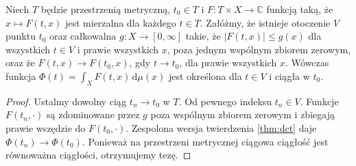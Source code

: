 \begin{twierdzenie}
\label{thm:parameter-continuity}
Niech $T$ będzie przestrzenią metryczną, $t_0\in T$
i $F:T\times X\to\mathbb C$ funkcją taką, że
$x\mapsto F(t,x)$ jest mierzalna dla każdego $t\in T$.
Załóżmy, że istnieje otoczenie $V$ punktu $t_0$
oraz całkowalna $g:X\to[0,\infty]$ takie, że
$|F(t,x)|\le g(x)$ dla wszystkich $t\in V$ i
prawie wszystkich $x$, poza jednym wspólnym zbiorem
zerowym, oraz że $F(t,x)\to F(t_0,x)$, gdy
$t\to t_0$, dla prawie wszystkich $x$.
Wówczas funkcja
$\Phi(t)=\int_XF(t,x)\,\mathrm d\mu(x)$
jest określona dla $t\in V$ i ciągła w $t_0$.
\end{twierdzenie}
\begin{proof}
Ustalmy dowolny ciąg $t_n\to t_0$ w $T$.
Od pewnego indeksu $t_n\in V$. Funkcje
$F(t_n,\cdot)$ są zdominowane przez $g$ poza
wspólnym zbiorem zerowym i zbiegają prawie wszędzie
do $F(t_0,\cdot)$. Zespolona wersja twierdzenia
\ref{thm:dct} daje $\Phi(t_n)\to\Phi(t_0)$.
Ponieważ na przestrzeni metrycznej ciągowa
ciągłość jest równoważna ciągłości, otrzymujemy tezę.
\end{proof}

